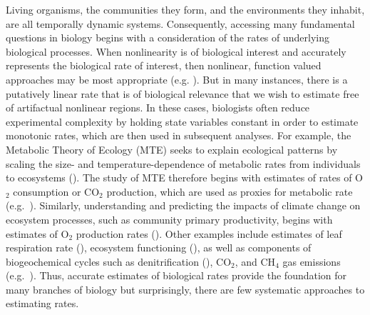 \documentclass[11pt]{article}
\newcommand*\chem[1]{\ensuremath{\mathrm{#1}}}
\begin{document}
Living organisms, the communities they form, and the environments they inhabit, are all temporally dynamic systems. Consequently, accessing many fundamental questions in biology begins with a consideration of the rates of underlying biological processes. When nonlinearity is of biological interest and accurately represents the biological rate of interest, then nonlinear, function valued approaches may be most appropriate (e.g. \citealt{MarshallWhite2013, Stinchcombe2012}). But in many instances, there is a putatively linear rate that is of biological relevance that we wish to estimate free of artifactual nonlinear regions. In these cases, biologists often reduce experimental complexity by holding state variables constant in order to estimate monotonic rates, which are then used in subsequent analyses. For example, the Metabolic Theory of Ecology (MTE) seeks to explain ecological patterns by scaling the size- and temperature-dependence of metabolic rates from individuals to ecosystems (\citealt{Gillooly_etal2001, Brown2004}). The study of MTE therefore begins with estimates of rates of O$_2$ consumption or CO$_2$ production, which are used as proxies for metabolic rate (e.g.~\citealt{Gillooly_etal2001,Brown2004,WhiteMarshall2011,Barneche2014}). Similarly, understanding and predicting the impacts of climate change on ecosystem processes, such as community primary productivity, begins with estimates of \chem{O_2} production rates (\citealt{Tanaka2013, YvonDurocher2015}). Other examples include estimates of leaf respiration rate (\citealt{Shapiro2004}), ecosystem functioning (\citealt{RossKeough2013}), as well as components of biogeochemical cycles such as denitrification (\citealt{Song2011}), CO$_2$, and CH$_4$ gas emissions (e.g.~\citealt{Larmola2013}). Thus, accurate estimates of biological rates provide the foundation for many branches of biology but surprisingly, there are few systematic approaches to estimating rates.
\end{document}
